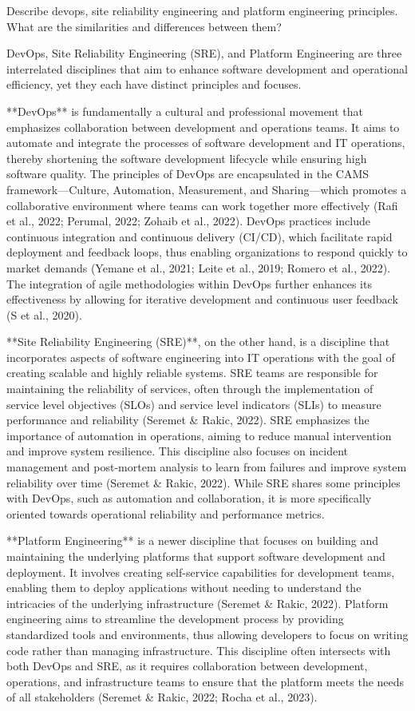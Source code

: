 Describe devops, site reliability engineering and platform engineering principles. What are the similarities and differences between them?

DevOps, Site Reliability Engineering (SRE), and Platform Engineering are three interrelated disciplines that aim to enhance software development and operational efficiency, yet they each have distinct principles and focuses.

**DevOps** is fundamentally a cultural and professional movement that emphasizes collaboration between development and operations teams. It aims to automate and integrate the processes of software development and IT operations, thereby shortening the software development lifecycle while ensuring high software quality. The principles of DevOps are encapsulated in the CAMS framework—Culture, Automation, Measurement, and Sharing—which promotes a collaborative environment where teams can work together more effectively (Rafi et al., 2022; Perumal, 2022; Zohaib et al., 2022). DevOps practices include continuous integration and continuous delivery (CI/CD), which facilitate rapid deployment and feedback loops, thus enabling organizations to respond quickly to market demands (Yemane et al., 2021; Leite et al., 2019; Romero et al., 2022). The integration of agile methodologies within DevOps further enhances its effectiveness by allowing for iterative development and continuous user feedback (S et al., 2020).

**Site Reliability Engineering (SRE)**, on the other hand, is a discipline that incorporates aspects of software engineering into IT operations with the goal of creating scalable and highly reliable systems. SRE teams are responsible for maintaining the reliability of services, often through the implementation of service level objectives (SLOs) and service level indicators (SLIs) to measure performance and reliability (Seremet & Rakic, 2022). SRE emphasizes the importance of automation in operations, aiming to reduce manual intervention and improve system resilience. This discipline also focuses on incident management and post-mortem analysis to learn from failures and improve system reliability over time (Seremet & Rakic, 2022). While SRE shares some principles with DevOps, such as automation and collaboration, it is more specifically oriented towards operational reliability and performance metrics.

**Platform Engineering** is a newer discipline that focuses on building and maintaining the underlying platforms that support software development and deployment. It involves creating self-service capabilities for development teams, enabling them to deploy applications without needing to understand the intricacies of the underlying infrastructure (Seremet & Rakic, 2022). Platform engineering aims to streamline the development process by providing standardized tools and environments, thus allowing developers to focus on writing code rather than managing infrastructure. This discipline often intersects with both DevOps and SRE, as it requires collaboration between development, operations, and infrastructure teams to ensure that the platform meets the needs of all stakeholders (Seremet & Rakic, 2022; Rocha et al., 2023).

